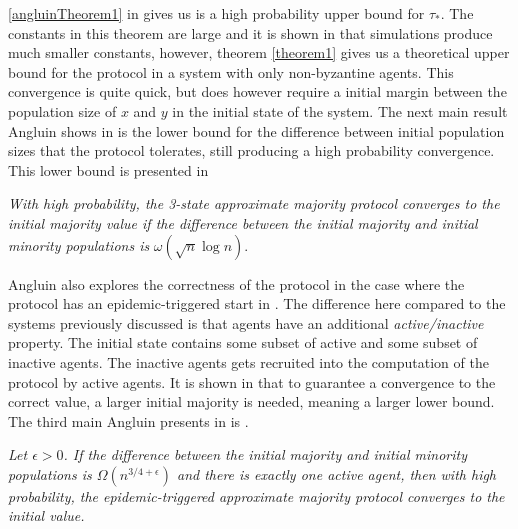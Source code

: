 \ref{angluinTheorem1} in  gives us is a high probability upper bound for $\tau_*$. The constants in this theorem are large and it is shown in \cite{angluinSimplePopulationProtocol2008} that simulations produce much smaller constants, however, theorem \ref{theorem1} gives us a theoretical upper bound for the protocol in a system with only non-byzantine agents. This convergence is quite quick, but does however require a initial margin between the population size of $x$ and $y$ in the initial state of the system. The next main result Angluin shows in \cite{angluinSimplePopulationProtocol2008} is the lower bound for the difference between initial population sizes that the protocol tolerates, still producing a high probability convergence. This lower bound is presented in 


 \begin{theorem}
    \textit{With high probability, the 3-state approximate majority protocol converges to the initial majority value if the difference between the initial majority and initial minority populations is } $\omega(\sqrt{n} \log n)$.
 \end{theorem} 

 Angluin also explores the correctness of the protocol in the case where the protocol has an epidemic-triggered start in \cite{angluinSimplePopulationProtocol2008}. The difference here compared to the systems previously discussed is that agents have an additional \emph{active/inactive} property. The initial state contains some subset of active and some subset of inactive agents. The inactive agents gets recruited into the computation of the protocol by active agents. It is shown in \cite{angluinSimplePopulationProtocol2008} that to guarantee a convergence to the correct value, a larger initial majority is needed, meaning a larger lower bound. The third main Angluin presents in \cite{angluinSimplePopulationProtocol2008} is .

 \begin{theorem}
    \textit{Let $\epsilon > 0$. If the difference between the initial majority and initial minority populations is $\Omega(n^{3/4+\epsilon})$ and there is exactly one active agent, then with high probability, the epidemic-triggered approximate majority protocol converges to the initial value.}
 \end{theorem} 

